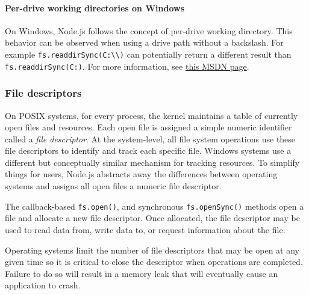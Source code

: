 \paragraph{Per-drive working directories on
Windows}\label{per-drive-working-directories-on-windows}

On Windows, Node.js follows the concept of per-drive working directory.
This behavior can be observed when using a drive path without a
backslash. For example
\texttt{fs.readdirSync(\textquotesingle{}C:\textbackslash{}\textbackslash{}\textquotesingle{})}
can potentially return a different result than
\texttt{fs.readdirSync(\textquotesingle{}C:\textquotesingle{})}. For
more information, see
\href{https://docs.microsoft.com/en-us/windows/desktop/FileIO/naming-a-file\#fully-qualified-vs-relative-paths}{this
MSDN page}.

\subsubsection{File descriptors}\label{file-descriptors-1}

On POSIX systems, for every process, the kernel maintains a table of
currently open files and resources. Each open file is assigned a simple
numeric identifier called a \emph{file descriptor}. At the system-level,
all file system operations use these file descriptors to identify and
track each specific file. Windows systems use a different but
conceptually similar mechanism for tracking resources. To simplify
things for users, Node.js abstracts away the differences between
operating systems and assigns all open files a numeric file descriptor.

The callback-based \texttt{fs.open()}, and synchronous
\texttt{fs.openSync()} methods open a file and allocate a new file
descriptor. Once allocated, the file descriptor may be used to read data
from, write data to, or request information about the file.

Operating systems limit the number of file descriptors that may be open
at any given time so it is critical to close the descriptor when
operations are completed. Failure to do so will result in a memory leak
that will eventually cause an application to crash.

